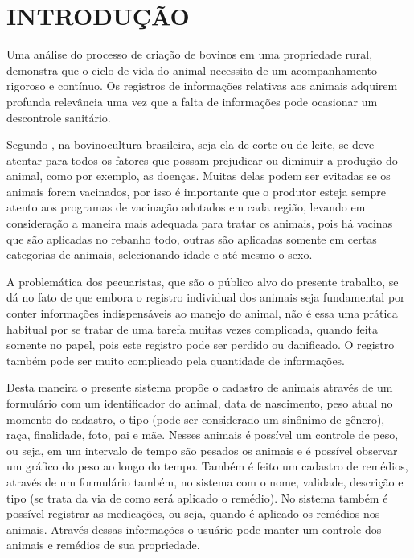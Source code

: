 %
%


\chapter{\textbf{INTRODUÇÃO}}\label{chap:introducao}

Uma análise do processo de criação de bovinos em uma propriedade rural, demonstra que o ciclo de vida do animal necessita de um acompanhamento rigoroso e contínuo. Os registros de informações relativas aos animais adquirem profunda relevância uma vez que a falta de informações pode ocasionar um descontrole sanitário.

Segundo , na bovinocultura brasileira, seja ela de corte ou de leite, se deve atentar para todos os fatores que possam prejudicar ou diminuir a produção do animal, como por exemplo, as doenças. Muitas  delas podem ser evitadas se os animais forem vacinados, por isso é importante que o produtor esteja sempre atento aos programas de vacinação adotados em cada região, levando em consideração a maneira mais adequada para tratar os animais, pois há vacinas que são aplicadas no rebanho todo, outras são aplicadas somente em certas categorias de animais, selecionando idade e até mesmo o sexo.

A problemática dos pecuaristas, que são o público alvo do presente trabalho, se dá no fato de que embora o registro individual dos animais seja fundamental por conter informações indispensáveis ao manejo do animal, não é essa uma prática habitual por se tratar de uma tarefa muitas vezes complicada, quando feita somente no papel, pois este registro pode ser perdido ou danificado. O registro também pode ser muito complicado pela quantidade de informações.

Desta maneira o presente sistema propôe o cadastro de animais através de um formulário com um identificador do animal, data de nascimento, peso atual no momento do cadastro, o tipo (pode ser considerado um sinônimo de gênero), raça, finalidade, foto, pai e mãe. Nesses animais é possível um controle de peso, ou seja, em um intervalo de tempo são pesados os animais e é possível observar um gráfico do peso ao longo do tempo. Também é feito um cadastro de remédios, através de um formulário também, no sistema com o nome, validade, descrição e tipo (se trata da via de como será aplicado o remédio). No sistema também é possível registrar as medicações, ou seja, quando é aplicado os remédios nos animais. Através dessas informações o usuário pode manter um controle dos animais e remédios de sua propriedade.
